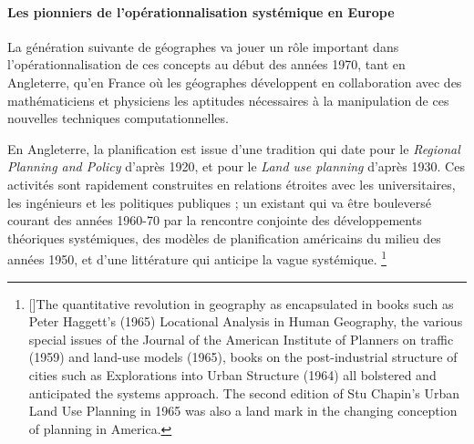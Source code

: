 \paragraph{Les pionniers de l'opérationnalisation systémique en Europe}

La génération suivante de géographes va jouer un rôle important dans l'opérationnalisation de ces concepts au début des années 1970, tant en Angleterre, qu'en France où les géographes développent en collaboration avec des mathématiciens et physiciens les aptitudes nécessaires à la manipulation de ces nouvelles techniques computationnelles. \autocite{Pumain2002}

En Angleterre, la planification est issue d'une tradition qui date pour le \textit{Regional Planning and Policy} d'après 1920, et pour le \textit{Land use planning} d'après 1930. Ces activités sont rapidement construites en relations étroites avec les universitaires, les ingénieurs et les politiques publiques \autocites{Bennett2003}[727]{Davies1997}; un existant qui va être bouleversé courant des années 1960-70 par la rencontre conjointe des développements théoriques systémiques, des modèles de planification américains du milieu des années 1950, et d'une littérature qui anticipe la vague systémique. \autocites{Mcloughin1969}[4-8]{McLoughin1985}[253]{Batty1978} \footnote{[{\cite[253]{Batty1978}}]{The quantitative revolution in geography as encapsulated in books such as Peter Haggett's (1965) Locational Analysis in Human Geography, the various special issues of the Journal of the American Institute of Planners on traffic (1959) and land-use models (1965), books on the post-industrial structure of cities such as Explorations into Urban Structure (1964) all bolstered and anticipated the systems approach. The second edition of Stu Chapin's Urban Land Use Planning in 1965 was also a land mark in the changing conception of planning in America.}}

